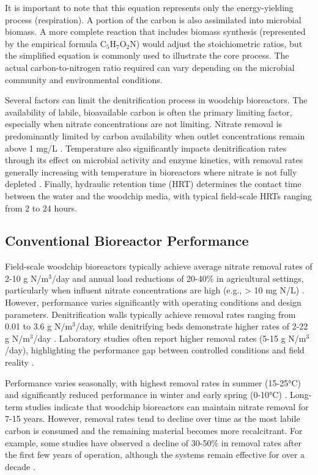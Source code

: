 \documentclass[12pt,a4paper]{article}
\begin{document}
It is important to note that this equation represents only the energy-yielding process (respiration). A portion of the carbon is also assimilated into microbial biomass. A more complete reaction that includes biomass synthesis (represented by the empirical formula C$_5$H$_7$O$_2$N) would adjust the stoichiometric ratios, but the simplified equation is commonly used to illustrate the core process. The actual carbon-to-nitrogen ratio required can vary depending on the microbial community and environmental conditions.

Several factors can limit the denitrification process in woodchip bioreactors. The availability of labile, bioavailable carbon is often the primary limiting factor, especially when nitrate concentrations are not limiting. Nitrate removal is predominantly limited by carbon availability when outlet concentrations remain above 1 mg/L \citep{RN629, RN242}. Temperature also significantly impacts denitrification rates through its effect on microbial activity and enzyme kinetics, with removal rates generally increasing with temperature in bioreactors where nitrate is not fully depleted \citep{RN625, RN228, RN258}. Finally, hydraulic retention time (HRT) determines the contact time between the water and the woodchip media, with typical field-scale HRTs ranging from 2 to 24 hours.

\subsection{Conventional Bioreactor Performance}

Field-scale woodchip bioreactors typically achieve average nitrate removal rates of 2-10 g N/m$^3$/day and annual load reductions of 20-40\% in agricultural settings, particularly when influent nitrate concentrations are high (e.g., > 10 mg N/L) \citep{RN312, RN310}. However, performance varies significantly with operating conditions and design parameters. Denitrification walls typically achieve removal rates ranging from 0.01 to 3.6 g N/m$^3$/day, while denitrifying beds demonstrate higher rates of 2-22 g N/m$^3$/day \citep{RN625, RN629}. Laboratory studies often report higher removal rates (5-15 g N/m$^3$/day), highlighting the performance gap between controlled conditions and field reality \citep{new_ref_4}.

Performance varies seasonally, with highest removal rates in summer (15-25°C) and significantly reduced performance in winter and early spring (0-10°C) \citep{RN228, RN258}. Long-term studies indicate that woodchip bioreactors can maintain nitrate removal for 7-15 years. However, removal rates tend to decline over time as the most labile carbon is consumed and the remaining material becomes more recalcitrant. For example, some studies have observed a decline of 30-50\% in removal rates after the first few years of operation, although the systems remain effective for over a decade \citep{RN629, RN310}.
\end{document}
